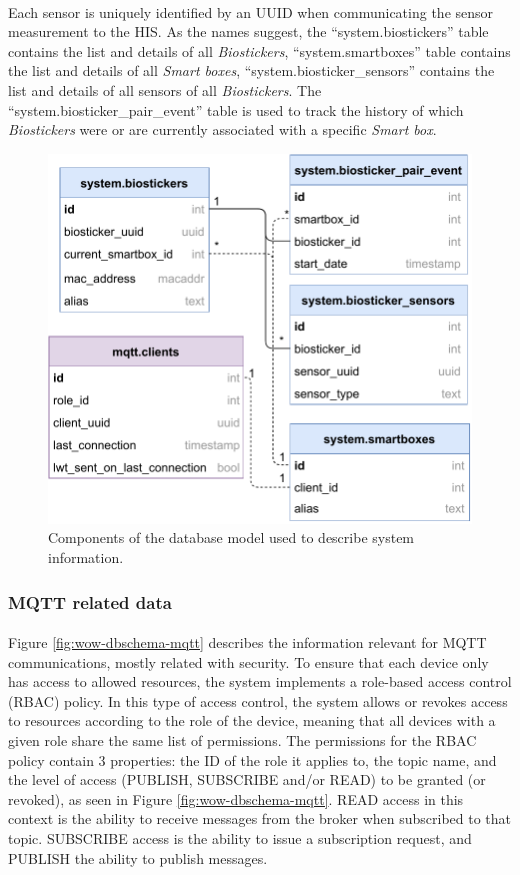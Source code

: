 \paragraph{} Each sensor is uniquely identified by an \acs{UUID} when communicating the sensor measurement to the \acs{HIS}. As the names suggest, the ``system.biostickers'' table contains the list and details of all \textit{Biostickers}, ``system.smartboxes'' table contains the list and details of all \textit{Smart boxes}, ``system.biosticker\_sensors'' contains the list and details of all sensors of all \textit{Biostickers}. The ``system.biosticker\_pair\_event'' table is used to track the history of which \textit{Biostickers} were or are currently associated with a specific \textit{Smart box}.

\begin{figure}[H]
    \centering
    \includegraphics[width=0.55\linewidth]{images/database-schema-system.pdf}
    \caption{
    Components of the database model used to describe system information.}
    \label{fig:wow-dbschema-system}
\end{figure}

\subsubsection{MQTT related data}

\paragraph{} Figure \ref{fig:wow-dbschema-mqtt} describes the information relevant for \acs{MQTT} communications, mostly related with security. To ensure that each device only has access to allowed resources, the system implements a role-based access control (\acs{RBAC}) policy. 
In this type of access control, the system allows or revokes access to resources according to the role of the device, meaning that all devices with a given role share the same list of permissions. The permissions for the \acs{RBAC} policy contain 3 properties: the ID of the role it applies to, the topic name, and the level of access (PUBLISH, SUBSCRIBE and/or READ) to be granted (or revoked), as seen in Figure \ref{fig:wow-dbschema-mqtt}. READ access in this context is the ability to receive messages from the broker when subscribed to that topic. SUBSCRIBE access is the ability to issue a subscription request, and PUBLISH the ability to publish messages.

